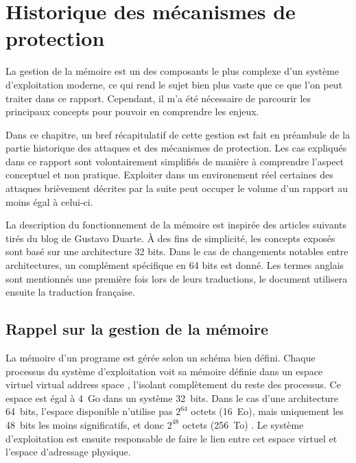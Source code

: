\chapter{Historique des mécanismes de protection}
\label{chap:historique}

La gestion de la mémoire est un des composants le plus complexe d'un système d'exploitation moderne, ce qui rend le sujet bien plus vaste que ce que l'on peut traiter dans ce rapport. Cependant, il m'a été nécessaire de parcourir les principaux concepts pour pouvoir en comprendre les enjeux.

Dans ce chapitre, un bref récapitulatif de cette gestion est fait en préambule de la partie historique des attaques et des mécanismes de protection. Les cas expliqués dans ce rapport sont volontairement simplifiés de manière à comprendre l'aspect conceptuel et non pratique. Exploiter dans un environement réel certaines des attaques brièvement décrites par la suite peut occuper le volume d'un rapport au moins égal à celui-ci.

La description du fonctionnement de la mémoire est inspirée des articles suivants \cite{AnatomyOfAProgramInMemory, HowTheKernelManagesYourMemory, JourneyToTheStackPartI} tirés du blog de Gustavo Duarte. À des fins de simplicité, les concepts exposés sont basé sur une architecture 32 bits. Dans le cas de changements notables entre architectures, un complément spécifique en 64 bits est donné. Les termes anglais sont mentionnés une première fois lors de leurs traductions, le document utilisera ensuite la traduction française.

\minitoc

\newpage

\section{Rappel sur la gestion de la mémoire}

La mémoire d'un programe est gérée selon un schéma bien défini. Chaque processus du système d'exploitation voit sa mémoire définie dans un espace virtuel \og virtual address space \fg, l'isolant complètement du reste des processus. Ce espace est égal à 4~Go dans un système 32~bits. Dans le cas d'une architecture 64~bits, l'espace disponible n'utilise pas $2^{64}$ octets (16~Eo), mais uniquement les 48~bits les moins significatifs, et donc $2^{48}$ octets (256~To) \cite{64bitComputing,VirtualAddressSpaceDetails}. Le système d'exploitation est ensuite responsable de faire le lien entre cet espace virtuel et l'espace d'adressage physique.

